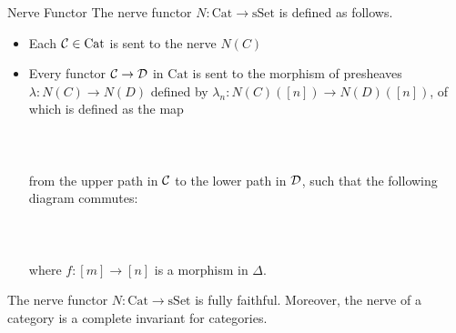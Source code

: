 \documentclass[a4paper]{article}
\begin{document}
\begin{defn}{Nerve Functor}{} The nerve functor $N:\text{Cat}\to\text{sSet}$ is defined as follows. 
\begin{itemize}
\item Each $\mathcal{C}\in\text{Cat}$ is sent to the nerve $N(C)$
\item Every functor $\mathcal{C}\to\mathcal{D}$ in $\text{Cat}$ is sent to the morphism of presheaves $\lambda:N(C)\to N(D)$ defined by $\lambda_n:N(C)([n])\to N(D)([n])$, of which is defined as the map \\~\\
\\~\\
from the upper path in $\mathcal{C}$ to the lower path in $\mathcal{D}$, such that the following diagram commutes: \\~\\
\\~\\
where $f:[m]\to[n]$ is a morphism in $\Delta$. 
\end{itemize}
\end{defn}

\begin{thm}{}{} The nerve functor $N:\text{Cat}\to\text{sSet}$ is fully faithful. Moreover, the nerve of a category is a complete invariant for categories. 
\end{thm}
\end{document}

